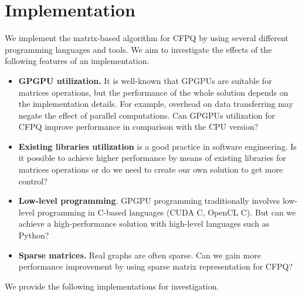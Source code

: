 \section{Implementation}

We implement the matrix-based algorithm for CFPQ by using several different programming languages and tools.
We aim to investigate the effects of the following features of an implementation.
\begin{itemize}
\item \textbf{GPGPU utilization.}
It is well-known that GPGPUs are suitable for matrices operations, but the performance of the whole solution depends on the implementation details. For example, overhead on data transferring may negate the effect of parallel computations.
Can GPGPUs utilization for CFPQ improve performance in comparison with the CPU version?

\item \textbf{Existing libraries utilization} is a good practice in software engineering.
Is it possible to achieve higher performance by means of existing libraries for matrices operations or do we need to create our own solution to get more control?

\item \textbf{Low-level programming}.
GPGPU programming traditionally involves low-level programming in C-based languages (CUDA C, OpenCL C).
But can we achieve a high-performance solution with high-level languages such as Python?

\item \textbf{Sparse matrices.} Real graphs are often sparse.
Can we gain more performance improvement by using sparse matrix representation for CFPQ?

\end{itemize}

We provide the following implementations for investigation.

